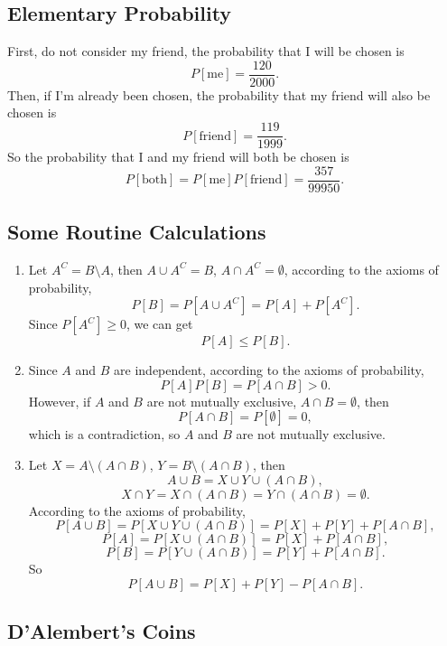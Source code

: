 \documentclass[11pt,a4paper]{article}
\author{Group 37}
\subtitle{Assignment}
\begin{document}
\maketitle

\subsection{Elementary Probability}

First, do not consider my friend, the probability that I will be chosen is
$$P[\textrm{me}]=\frac{120}{2000}.$$
Then, if I'm already been chosen, the probability that my friend will also be chosen is
$$P[\textrm{friend}]=\frac{119}{1999}.$$
So the probability that I and my friend will both be chosen is
$$P[\textrm{both}]=P[\textrm{me}]P[\textrm{friend}]=\frac{357}{99950}.$$

\subsection{Some Routine Calculations}

\begin{enumerate}[label=\roman*)]
\item
Let $A^C=B\setminus A$, then $A\cup A^C=B$, $A\cap A^C=\emptyset$, according to the axioms of probability,
$$P[B]=P[A\cup A^C]=P[A]+P[A^C].$$
Since $P[A^C]\geqslant 0$, we can get
$$P[A]\leqslant P[B].$$
\item 
Since $A$ and $B$ are independent, according to the axioms of probability,
$$P[A]P[B]=P[A\cap B]>0.$$
However, if $A$ and $B$ are not mutually exclusive,
$A\cap B=\emptyset$, then
$$P[A\cap B]=P[\emptyset]=0,$$
which is a contradiction, so $A$ and $B$ are not mutually exclusive. \bigskip
\item 
Let $X=A\setminus(A\cap B)$, $Y=B\setminus(A\cap B)$, then 
$$A\cup B=X\cup Y\cup (A\cap B),$$
$$X\cap Y=X\cap(A\cap B)=Y\cap(A\cap B)=\emptyset.$$
According to the axioms of probability,
$$P[A\cup B]=P[X\cup Y\cup (A\cap B)]=P[X]+P[Y]+P[A\cap B],$$
$$P[A]=P[X\cup(A\cap B)]=P[X]+P[A\cap B],$$
$$P[B]=P[Y\cup(A\cap B)]=P[Y]+P[A\cap B].$$
So $$P[A\cup B]=P[X]+P[Y]-P[A\cap B].$$
\end{enumerate}

\subsection{D'Alembert's Coins}
\end{document}
